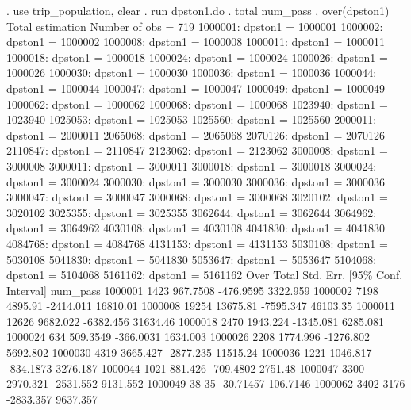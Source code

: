 . use trip_population, clear
{\smallskip}
. run dpston1.do
{\smallskip}
. total num_pass , over(dpston1)
{\smallskip}
Total estimation                  Number of obs   =        719
{\smallskip}
      1000001: dpston1 = 1000001
      1000002: dpston1 = 1000002
      1000008: dpston1 = 1000008
      1000011: dpston1 = 1000011
      1000018: dpston1 = 1000018
      1000024: dpston1 = 1000024
      1000026: dpston1 = 1000026
      1000030: dpston1 = 1000030
      1000036: dpston1 = 1000036
      1000044: dpston1 = 1000044
      1000047: dpston1 = 1000047
      1000049: dpston1 = 1000049
      1000062: dpston1 = 1000062
      1000068: dpston1 = 1000068
      1023940: dpston1 = 1023940
      1025053: dpston1 = 1025053
      1025560: dpston1 = 1025560
      2000011: dpston1 = 2000011
      2065068: dpston1 = 2065068
      2070126: dpston1 = 2070126
      2110847: dpston1 = 2110847
      2123062: dpston1 = 2123062
      3000008: dpston1 = 3000008
      3000011: dpston1 = 3000011
      3000018: dpston1 = 3000018
      3000024: dpston1 = 3000024
      3000030: dpston1 = 3000030
      3000036: dpston1 = 3000036
      3000047: dpston1 = 3000047
      3000068: dpston1 = 3000068
      3020102: dpston1 = 3020102
      3025355: dpston1 = 3025355
      3062644: dpston1 = 3062644
      3064962: dpston1 = 3064962
      4030108: dpston1 = 4030108
      4041830: dpston1 = 4041830
      4084768: dpston1 = 4084768
      4131153: dpston1 = 4131153
      5030108: dpston1 = 5030108
      5041830: dpston1 = 5041830
      5053647: dpston1 = 5053647
      5104068: dpston1 = 5104068
      5161162: dpston1 = 5161162
{\smallskip}
        Over {\VBAR}      Total   Std. Err.     [95\% Conf. Interval]
num_pass     {\VBAR}
     1000001 {\VBAR}       1423   967.7508     -476.9595    3322.959
     1000002 {\VBAR}       7198    4895.91     -2414.011    16810.01
     1000008 {\VBAR}      19254   13675.81     -7595.347    46103.35
     1000011 {\VBAR}      12626   9682.022     -6382.456    31634.46
     1000018 {\VBAR}       2470   1943.224     -1345.081    6285.081
     1000024 {\VBAR}        634   509.3549     -366.0031    1634.003
     1000026 {\VBAR}       2208   1774.996     -1276.802    5692.802
     1000030 {\VBAR}       4319   3665.427     -2877.235    11515.24
     1000036 {\VBAR}       1221   1046.817     -834.1873    3276.187
     1000044 {\VBAR}       1021    881.426     -709.4802     2751.48
     1000047 {\VBAR}       3300   2970.321     -2531.552    9131.552
     1000049 {\VBAR}         38         35     -30.71457    106.7146
     1000062 {\VBAR}       3402       3176     -2833.357    9637.357
